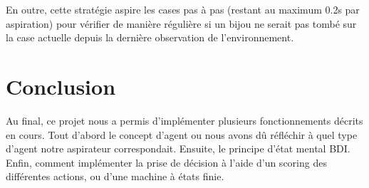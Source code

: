 \documentclass{article}
\begin{document}
En outre, cette stratégie aspire les cases pas à pas (restant au maximum 0.2s par
aspiration) pour vérifier de manière régulière si un bijou ne serait pas tombé
sur la case actuelle depuis la dernière observation de l'environnement.


\section{Conclusion}
Au final, ce projet nous a permis d'implémenter plusieurs fonctionnements
décrits en cours. Tout d'abord le concept d'agent ou nous avons dû réfléchir à
quel type d'agent notre aspirateur correspondait. Ensuite, le principe d'état
mental BDI. Enfin, comment implémenter la prise de décision à l'aide d'un
scoring des différentes actions, ou d'une machine à états finie.
\end{document}
